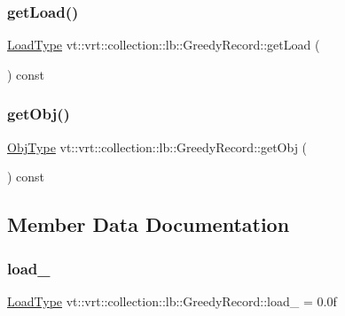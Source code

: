 \subsubsection{\texorpdfstring{get\+Load()}{getLoad()}}
{\footnotesize\ttfamily \hyperlink{structvt_1_1vrt_1_1collection_1_1lb_1_1_greedy_record_a3ac0f749c48eb624837eda5bca988845}{Load\+Type} vt\+::vrt\+::collection\+::lb\+::\+Greedy\+Record\+::get\+Load (\begin{DoxyParamCaption}{ }\end{DoxyParamCaption}) const\hspace{0.3cm}{\ttfamily [inline]}}

\mbox{\label{structvt_1_1vrt_1_1collection_1_1lb_1_1_greedy_record_a5f7a3e144c43f74c587ff054af1e267f}} 
\subsubsection{\texorpdfstring{get\+Obj()}{getObj()}}
{\footnotesize\ttfamily \hyperlink{structvt_1_1vrt_1_1collection_1_1lb_1_1_greedy_record_a6b0754b2434fca9e865fa8422e3d709e}{Obj\+Type} vt\+::vrt\+::collection\+::lb\+::\+Greedy\+Record\+::get\+Obj (\begin{DoxyParamCaption}{ }\end{DoxyParamCaption}) const\hspace{0.3cm}{\ttfamily [inline]}}



\subsection{Member Data Documentation}
\mbox{\label{structvt_1_1vrt_1_1collection_1_1lb_1_1_greedy_record_a77a97b5c704fc0e2e9b0c14125051d74}} 
\subsubsection{\texorpdfstring{load\+\_\+}{load\_}}
{\footnotesize\ttfamily \hyperlink{structvt_1_1vrt_1_1collection_1_1lb_1_1_greedy_record_a3ac0f749c48eb624837eda5bca988845}{Load\+Type} vt\+::vrt\+::collection\+::lb\+::\+Greedy\+Record\+::load\+\_\+ = 0.\+0f\hspace{0.3cm}{\ttfamily [private]}}

